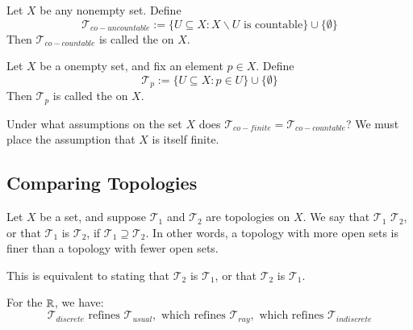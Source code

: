 \documentclass[12pt, a4paper, oneside, openright, titlepage]{book}
\begin{document}
\begin{example}
    Let $X$ be any nonempty set. Define \begin{equation*}
        \mathcal{T}_{co-uncountable} := \{U\subseteq X:X\backslash U\text{ is countable}\}\cup\{\emptyset\}
    \end{equation*}
    Then $\mathcal{T}_{co-countable}$ is called the  on $X$.
\end{example}

\begin{example}
    Let $X$ be a onempty set, and fix an element $p \in X$. Define \begin{equation*}
        \mathcal{T}_p :=\{U\subseteq X:p \in U\}\cup\{\emptyset\}
    \end{equation*}
    Then $\mathcal{T}_p$ is called the  on $X$.
\end{example}

\begin{exercise}
    Under what assumptions on the set $X$ does $\mathcal{T}_{co-finite} = \mathcal{T}_{co-countable}$? We must place the assumption that $X$ is itself finite.
\end{exercise}


\subsection{Comparing Topologies}


\begin{definition}
    Let $X$ be a set, and suppose $\mathcal{T}_1$ and $\mathcal{T}_2$ are topologies on $X$. We say that $\mathcal{T}_1$  $\mathcal{T}_2$, or that $\mathcal{T}_1$ is  $\mathcal{T}_2$, if $\mathcal{T}_1 \supseteq \mathcal{T}_2$. In other words, a topology with more open sets is finer than a topology with fewer open sets.

    This is equivalent to stating that $\mathcal{T}_2$ is  $\mathcal{T}_1$, or that $\mathcal{T}_2$ is  $\mathcal{T}_1$.
\end{definition}


\begin{example}
    For the $\mathbb R$, we have: \begin{equation*}
        \mathcal{T}_{discrete} \text{ refines }\mathcal{T}_{usual}, \text{ which refines }\mathcal{T}_{ray}, \text{ which refines }\mathcal{T}_{indiscrete}
    \end{equation*}
\end{example}
\end{document}
